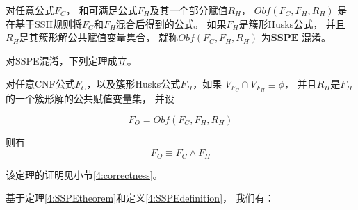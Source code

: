 \begin{definition}\label{4:OBFUSCATORSSH}
对任意公式$F_C$，
和可满足公式$F_H$及其一个部分赋值$R_H$，
$Obf(F_C,F_H,R_H)$ 是在基于SSH规则将$F_C$和$F_H$混合后得到的公式。
如果$F_H$是簇形Husks公式，
并且$R_H$是其簇形解公共赋值变量集合，
就称$Obf(F_C,F_H,R_H)$ 为${\textbf{SSPE 混淆}}$。
\end{definition}

对SSPE混淆，下列定理成立。

%
%
%

\begin{theorem}\label{4:SSPEtheorem}
对任意CNF公式$F_C$，以及簇形Husks公式$F_H$，如果
$V_{F_C}\cap V_{F_H}\equiv \phi$，
并且$R_H$是$F_H$的一个簇形解的公共赋值变量集，
并设

\begin{equation}
F_O=Obf(F_C,F_H,R_H)
\end{equation}

则有
\begin{equation}
F_O \equiv F_C \wedge F_H
\end{equation}
\end{theorem}

该定理的证明见小节\ref{4:correctness}。

基于定理\ref{4:SSPEtheorem}和定义\ref{4:SSPEdefinition}，
我们有：


